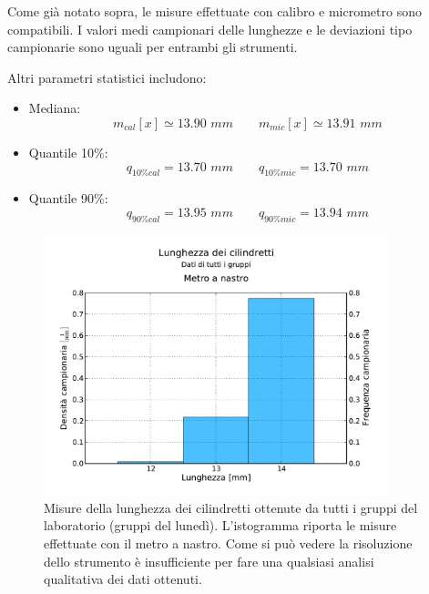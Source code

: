 Come già notato sopra, le misure effettuate con calibro e micrometro sono compatibili.
I valori medi campionari delle lunghezze e le deviazioni tipo campionarie sono
uguali per entrambi gli strumenti.

Altri parametri statistici includono:

\begin{itemize}
    \item{Mediana:}
        \begin{equation*}
        m_{cal}[x] \simeq 13.90\,\,mm \qquad
        m_{mic}[x] \simeq 13.91\,\,mm 
        \end{equation*}

    \item{Quantile 10\%:}
        \begin{equation*}
        q_{10\%cal} = 13.70\,\,mm \qquad
        q_{10\%mic} = 13.70\,\,mm
        \end{equation*}

    \item{Quantile 90\%:}
        \begin{equation*}
        q_{90\%cal} = 13.95\,\,mm \qquad
        q_{90\%mic} = 13.94\,\,mm
        \end{equation*}
\end{itemize}

\begin{figure}
	\centering
	\includegraphics[width=100mm]{grafici/cilindri_tutti.pdf}
	\caption{Misure della lunghezza dei cilindretti ottenute da tutti i gruppi del
        laboratorio (gruppi del lunedì). L'istogramma riporta le misure effettuate con
        il metro a nastro. Come si può vedere la risoluzione dello strumento è
        insufficiente per fare una qualsiasi analisi qualitativa dei dati ottenuti.}
    \label{fig:metro_tutti}
\end{figure}

